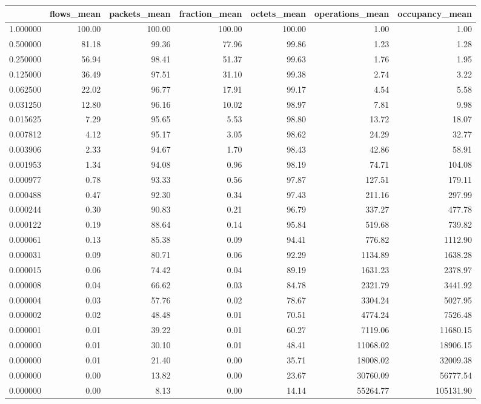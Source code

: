 \begin{tabular}{lrrrrrr}
\toprule
 & flows_mean & packets_mean & fraction_mean & octets_mean & operations_mean & occupancy_mean \\
\midrule
1.000000 & 100.00 & 100.00 & 100.00 & 100.00 & 1.00 & 1.00 \\
0.500000 & 81.18 & 99.36 & 77.96 & 99.86 & 1.23 & 1.28 \\
0.250000 & 56.94 & 98.41 & 51.37 & 99.63 & 1.76 & 1.95 \\
0.125000 & 36.49 & 97.51 & 31.10 & 99.38 & 2.74 & 3.22 \\
0.062500 & 22.02 & 96.77 & 17.91 & 99.17 & 4.54 & 5.58 \\
0.031250 & 12.80 & 96.16 & 10.02 & 98.97 & 7.81 & 9.98 \\
0.015625 & 7.29 & 95.65 & 5.53 & 98.80 & 13.72 & 18.07 \\
0.007812 & 4.12 & 95.17 & 3.05 & 98.62 & 24.29 & 32.77 \\
0.003906 & 2.33 & 94.67 & 1.70 & 98.43 & 42.86 & 58.91 \\
0.001953 & 1.34 & 94.08 & 0.96 & 98.19 & 74.71 & 104.08 \\
0.000977 & 0.78 & 93.33 & 0.56 & 97.87 & 127.51 & 179.11 \\
0.000488 & 0.47 & 92.30 & 0.34 & 97.43 & 211.16 & 297.99 \\
0.000244 & 0.30 & 90.83 & 0.21 & 96.79 & 337.27 & 477.78 \\
0.000122 & 0.19 & 88.64 & 0.14 & 95.84 & 519.68 & 739.82 \\
0.000061 & 0.13 & 85.38 & 0.09 & 94.41 & 776.82 & 1112.90 \\
0.000031 & 0.09 & 80.71 & 0.06 & 92.29 & 1134.89 & 1638.28 \\
0.000015 & 0.06 & 74.42 & 0.04 & 89.19 & 1631.23 & 2378.97 \\
0.000008 & 0.04 & 66.62 & 0.03 & 84.78 & 2321.79 & 3441.92 \\
0.000004 & 0.03 & 57.76 & 0.02 & 78.67 & 3304.24 & 5027.95 \\
0.000002 & 0.02 & 48.48 & 0.01 & 70.51 & 4774.24 & 7526.48 \\
0.000001 & 0.01 & 39.22 & 0.01 & 60.27 & 7119.06 & 11680.15 \\
0.000000 & 0.01 & 30.10 & 0.01 & 48.41 & 11068.02 & 18906.15 \\
0.000000 & 0.01 & 21.40 & 0.00 & 35.71 & 18008.02 & 32009.38 \\
0.000000 & 0.00 & 13.82 & 0.00 & 23.67 & 30760.09 & 56777.54 \\
0.000000 & 0.00 & 8.13 & 0.00 & 14.14 & 55264.77 & 105131.90 \\
\bottomrule
\end{tabular}
